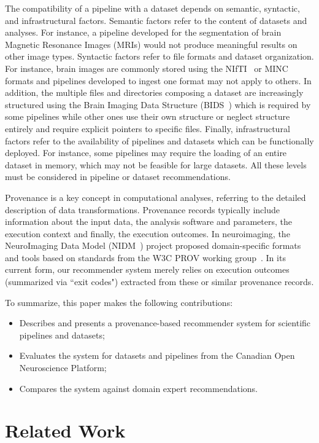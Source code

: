 \documentclass[conference]{IEEEtran}
\begin{document}
The compatibility of a pipeline with a dataset depends on
semantic, syntactic, and infrastructural factors. Semantic factors refer to
the content of datasets and analyses. For instance, a pipeline developed
for the segmentation of brain Magnetic Resonance Images (MRIs) would not produce
meaningful results on other image types. Syntactic factors refer to file
formats and dataset organization. For instance, brain images are commonly
stored using the NIfTI~\cite{larobina2014medical} or
MINC~\cite{vincent2016minc} formats and pipelines developed to ingest one
format may not apply to others. In addition, the multiple files and
directories composing a dataset are increasingly structured using the Brain
Imaging Data Structure (BIDS~\cite{bids}) which is required by some
pipelines while other ones use their own structure or neglect structure entirely and require explicit pointers to specific files. Finally,
infrastructural factors refer to the availability of pipelines
and datasets which can be functionally deployed. For instance, some pipelines may require the loading of an
entire dataset in memory, which may not be feasible for large datasets. All
these levels must be considered in pipeline or dataset recommendations.

Provenance is a key concept in computational analyses, referring to the
detailed description of data transformations. Provenance records typically include
information about the input data, the analysis
software and parameters, the execution context and finally, the execution outcomes. In neuroimaging, the NeuroImaging Data Model (NIDM~\cite{maumet2016sharing}) project proposed domain-specific
formats and tools based on standards from the W3C PROV working
group~\cite{missier2013w3c}. In its current form, our
recommender system merely relies on execution outcomes (summarized via ``exit codes")
extracted from these or similar provenance records.

To summarize, this paper makes the following contributions:
\begin{itemize}
\item  Describes and presents a provenance-based recommender system for scientific
pipelines and datasets;
\item Evaluates the system for datasets and pipelines from the Canadian
Open Neuroscience Platform;
\item Compares the system against domain expert recommendations.
\end{itemize}

\section{Related Work}
    
\end{document}
